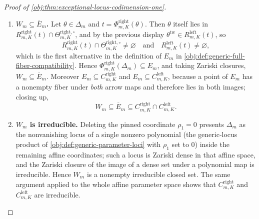 \documentclass[11pt]{article}
\begin{document}
\begin{proof}[Proof of \cref{obj:thm:exceptional-locus-codimension-one}]
\begin{enumerate}
\item \textbf{\(W_m\subseteq\overline E_m\).}  Let \(\theta\in\Delta_m\) and \(t=\Phi^{\mathrm{right}}_{m,K}(\theta)\).  Then \(\theta\) itself lies in \(R^{\mathrm{right}}_{m,K}(t)\cap\Theta^{\mathrm{right},\circ}_{m,K}\), and by the previous display \(\theta^{\mathrm{tw}}\in R^{\mathrm{left}}_{m,K}(t)\), so
\[
R^{\mathrm{right}}_{m,K}(t)\cap\Theta^{\mathrm{right},\circ}_{m,K}\ne\varnothing
\quad\text{and}\quad
R^{\mathrm{left}}_{m,K}(t)\ne\varnothing,
\]
which is the first alternative in the definition of \(E_m\) in \cref{obj:def:generic-full-fiber-compatibility}.  Hence \(\Phi^{\mathrm{right}}_{m,K}(\Delta_m)\subseteq E_m\), and taking Zariski closures, \(W_m\subseteq\overline E_m\).  Moreover \(E_m\subseteq C^{\mathrm{right}}_{m,K}\) and \(E_m\subseteq C^{\mathrm{left}}_{m,K}\), because a point of \(E_m\) has a nonempty fiber under \emph{both} arrow maps and therefore lies in both images; closing up,
\[
W_m\subseteq\overline E_m\subseteq C^{\mathrm{right}}_{m,K}\cap C^{\mathrm{left}}_{m,K}.
\]

\item \textbf{\(W_m\) is irreducible.}  Deleting the pinned coordinate \(\rho_1=0\) presents \(\Delta_m\) as the nonvanishing locus of a single nonzero polynomial (the generic-locus product of \cref{obj:def:generic-parameter-loci} with \(\rho_1\) set to \(0\)) inside the remaining affine coordinates; such a locus is Zariski dense in that affine space, and the Zariski closure of the image of a dense set under a polynomial map is irreducible.  Hence \(W_m\) is a nonempty irreducible closed set.  The same argument applied to the whole affine parameter space shows that \(C^{\mathrm{right}}_{m,K}\) and \(C^{\mathrm{left}}_{m,K}\) are irreducible.


\end{enumerate}
\end{proof}
\end{document}
